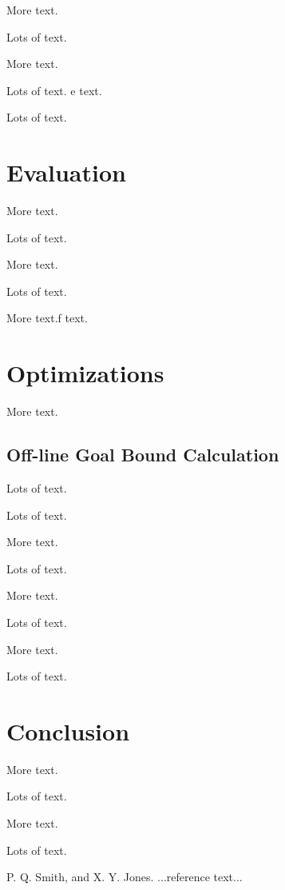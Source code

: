 \documentclass{sigplanconf}[10pt]
\begin{document}
More text.

Lots of text.

More text.

Lots of text.
e text.

Lots of text.
\section{Evaluation}
\label{eval}
More text.

Lots of text.

More text.

Lots of text.

More text.f text.


\section{Optimizations}
\label{optimi}
More text.
\subsection{Off-line Goal Bound Calculation}
Lots of text.

Lots of text.

More text.

Lots of text.

More text.

Lots of text.

More text.

Lots of text.
\section{Conclusion}
\label{conclusion}
More text.

Lots of text.

More text.

Lots of text.






\begin{thebibliography}{}
\softraggedright

P. Q. Smith, and X. Y. Jones. ...reference text...

\end{thebibliography}
\end{document}
